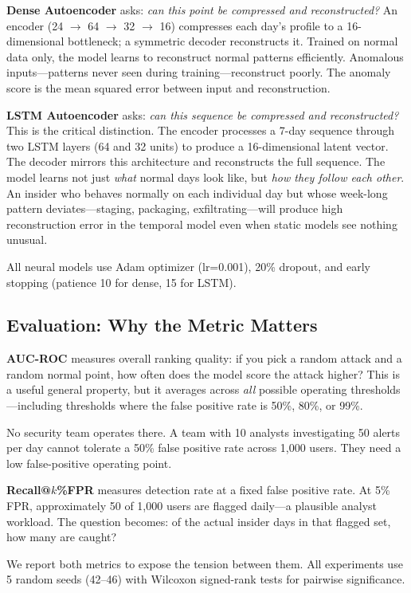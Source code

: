 \documentclass[conference]{IEEEtran}
\begin{document}
\textbf{Dense Autoencoder} asks: \textit{can this point be compressed and reconstructed?} An encoder (24 $\to$ 64 $\to$ 32 $\to$ 16) compresses each day's profile to a 16-dimensional bottleneck; a symmetric decoder reconstructs it. Trained on normal data only, the model learns to reconstruct normal patterns efficiently. Anomalous inputs---patterns never seen during training---reconstruct poorly. The anomaly score is the mean squared error between input and reconstruction.

\textbf{LSTM Autoencoder} asks: \textit{can this sequence be compressed and reconstructed?} This is the critical distinction. The encoder processes a 7-day sequence through two LSTM layers (64 and 32 units) to produce a 16-dimensional latent vector. The decoder mirrors this architecture and reconstructs the full sequence. The model learns not just \textit{what} normal days look like, but \textit{how they follow each other}. An insider who behaves normally on each individual day but whose week-long pattern deviates---staging, packaging, exfiltrating---will produce high reconstruction error in the temporal model even when static models see nothing unusual.

All neural models use Adam optimizer (lr=0.001), 20\% dropout, and early stopping (patience 10 for dense, 15 for LSTM).

\subsection{Evaluation: Why the Metric Matters}
\label{sec:metrics}

\textbf{AUC-ROC} measures overall ranking quality: if you pick a random attack and a random normal point, how often does the model score the attack higher? This is a useful general property, but it averages across \textit{all} possible operating thresholds---including thresholds where the false positive rate is 50\%, 80\%, or 99\%.

No security team operates there. A team with 10 analysts investigating 50 alerts per day cannot tolerate a 50\% false positive rate across 1,000 users. They need a low false-positive operating point.

\textbf{Recall@$k$\%FPR} measures detection rate at a fixed false positive rate. At 5\% FPR, approximately 50 of 1,000 users are flagged daily---a plausible analyst workload. The question becomes: of the actual insider days in that flagged set, how many are caught?

We report both metrics to expose the tension between them. All experiments use 5 random seeds (42--46) with Wilcoxon signed-rank tests for pairwise significance.
\end{document}
